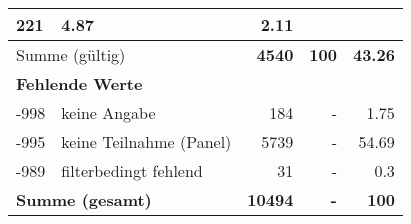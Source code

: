 \begin{longtable}{lXrrr}
       \num{221} &
       \num[round-mode=places,round-precision=2]{4.87} &
         \num[round-mode=places,round-precision=2]{2.11} \\
     \midrule
     \multicolumn{2}{l}{Summe (gültig)} &
       \textbf{\num{4540}} &
     \textbf{\num{100}} &
       \textbf{\num[round-mode=places,round-precision=2]{43.26}} \\
     \multicolumn{5}{l}{\textbf{Fehlende Werte}}\\
       -998 &
       keine Angabe &
         \num{184} &
        - &
         \num[round-mode=places,round-precision=2]{1.75} \\
       -995 &
       keine Teilnahme (Panel) &
         \num{5739} &
        - &
         \num[round-mode=places,round-precision=2]{54.69} \\
       -989 &
       filterbedingt fehlend &
         \num{31} &
        - &
         \num[round-mode=places,round-precision=2]{0.3} \\
     \midrule
     \multicolumn{2}{l}{\textbf{Summe (gesamt)}} &
          \textbf{\num{10494}} &
        \textbf{-} &
        \textbf{\num{100}} \\
     \bottomrule
     \end{longtable}
     
